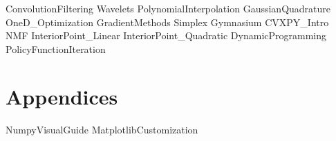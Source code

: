 \documentclass[opener-c,labs,red,nociteref]{HJnewsiambook}
\begin{document}
{ConvolutionFiltering}
{Wavelets}
{PolynomialInterpolation}
{GaussianQuadrature}
{OneD_Optimization}
{GradientMethods}
{Simplex}
{Gymnasium}
{CVXPY_Intro}
{NMF}
{InteriorPoint_Linear}
{InteriorPoint_Quadratic}
{DynamicProgramming}
{PolicyFunctionIteration}

\fi

\part{Appendices}
\begin{appendices}
{NumpyVisualGuide}
{MatplotlibCustomization}
\end{appendices}



\end{document}
